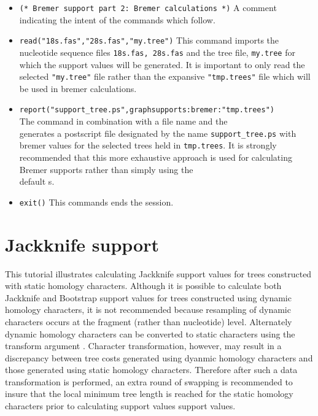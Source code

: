 \begin{itemize}
\item \texttt{(* Bremer support part 2: Bremer calculations *)}  A comment indicating the intent of the commands which follow.
\item \texttt{read("18s.fas","28s.fas","my.tree")} This command imports the nucleotide sequence files \texttt{18s.fas, 28s.fas} and the tree file, \texttt{my.tree} for which the support values will be generated.  It is important to only read the selected \texttt{"my.tree"} file rather than the expansive  \texttt{"tmp.trees"} file which will be used in bremer calculations.
\item \texttt{report("support\_tree.ps",graphsupports:bremer:"tmp.trees")} \\The {} command in combination with a file name and the \\  generates a postscript file designated by the name \texttt{support\_tree.ps} with bremer values for the selected trees held in \texttt{tmp.trees}.  It is strongly recommended that this more exhaustive approach is used for calculating Bremer supports rather than simply using the \\  default s.  
\item \texttt{exit()} This commands ends the \poy session.
\end{itemize}

\section{Jackknife support}{\label{tutorial 4}}

This tutorial illustrates calculating Jackknife support values for trees constructed with static homology characters.  Although it is possible to calculate both Jackknife and Bootstrap support values 
for trees constructed using dynamic homology characters, it is not recommended because resampling of dynamic characters occurs at the fragment (rather than nucleotide) level. Alternately dynamic homology characters can be converted to static characters using the transform argument .  Character transformation, however, may result in a discrepancy between tree costs generated using dyanmic homology characters and those generated using static homology characters. Therefore after such a data transformation is performed, an extra round of swapping is recommended to insure that the local minimum tree length is reached for the static homology characters prior to calculating support values  support values.


